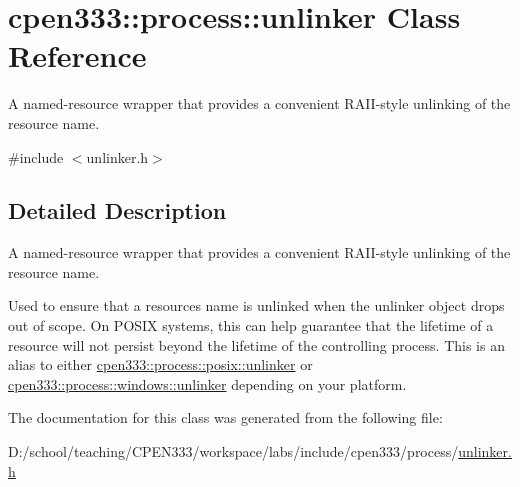 \hypertarget{classcpen333_1_1process_1_1unlinker}{}\section{cpen333\+:\+:process\+:\+:unlinker Class Reference}
\label{classcpen333_1_1process_1_1unlinker}


A named-\/resource wrapper that provides a convenient R\+A\+I\+I-\/style unlinking of the resource name.  




{\ttfamily \#include $<$unlinker.\+h$>$}



\subsection{Detailed Description}
A named-\/resource wrapper that provides a convenient R\+A\+I\+I-\/style unlinking of the resource name. 

Used to ensure that a resource\textquotesingle{}s name is unlinked when the unlinker object drops out of scope. On P\+O\+S\+IX systems, this can help guarantee that the lifetime of a resource will not persist beyond the lifetime of the controlling process. This is an alias to either \hyperlink{classcpen333_1_1process_1_1posix_1_1unlinker}{cpen333\+::process\+::posix\+::unlinker} or \hyperlink{classcpen333_1_1process_1_1windows_1_1unlinker}{cpen333\+::process\+::windows\+::unlinker} depending on your platform. 

The documentation for this class was generated from the following file\+:\begin{DoxyCompactItemize}
\item 
D\+:/school/teaching/\+C\+P\+E\+N333/workspace/labs/include/cpen333/process/\hyperlink{unlinker_8h}{unlinker.\+h}\end{DoxyCompactItemize}
